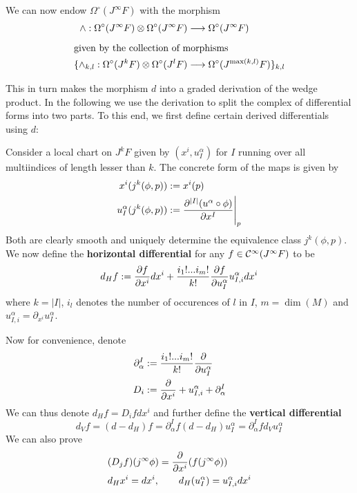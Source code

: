 We can now endow $\Omega^\circ(J^\infty F)$ with the morphism
\begin{align*}
  \wedge: \Omega^\circ(J^\infty F) \mathbin{\mathop{\otimes}\displaylimits_{}} \Omega^\circ(J^\infty F) &\longrightarrow \Omega^\circ(J^\infty F)\\
  \intertext{given by the collection of morphisms}
  \{ \wedge_{k,l}: \Omega^\circ(J^k F) \mathbin{\mathop{\otimes}\displaylimits_{}} \Omega^\circ(J^l F) &\longrightarrow \Omega^\circ(J^{\max(k,l)} F) \}_{k,l}
\end{align*}
This in turn makes the morphism $d$ into a graded derivation of the wedge product. In the following we use the derivation to split the complex of differential forms into two parts. To this end, we first define certain derived differentials using $d$:

\begin{definition}
  Consider a local chart on $J^kF$ given by $(x^i, u^\alpha_I)$ for $I$ running over all multiindices of length lesser than $k$. The concrete form of the maps is given by
  \begin{align*}
    x^i(j^k(\phi, p)) &:= x^i(p)\\
    u^\alpha_I (j^k(\phi, p)) &:= \dell{^{|I|} (u^\alpha \circ \phi)}{x^I} \Bigg|_p
  \end{align*}
  Both are clearly smooth and uniquely determine the equivalence class $j^k(\phi, p)$. We now define the \textbf{horizontal differential} for any $f\in\mathcal{C}^{\infty}(J^\infty F)$ to be
  $$ d_H f := \frac{\partial f}{\partial x^i} dx^i + \frac{i_1 ! ... i_m !}{k!} \frac{\partial f}{\partial u^\alpha_I} u^\alpha_{I,i} dx^i$$
  where $k = |I|$, $i_l$ denotes the number of occurences of $l$ in $I$, $m = \dim(M)$ and $u^\alpha_{I,i} = \partial_{x^i} u^\alpha_I$.
\end{definition}

Now for convenience, denote
\begin{align*}
  \partial^I_\alpha &:= \frac{i_1 ! ... i_m !}{k!} \frac{\partial }{\partial u^\alpha_I}\\
  D_i &:= \frac{\partial }{\partial x^i} + u^\alpha_{I,i} + \partial^I_\alpha
\end{align*}
We can thus denote $d_H f = D_i f dx^i$ and further define the \textbf{vertical differential}
$$ d_V f = (d-d_H) f = \partial^I_\alpha f (d-d_H) u^\alpha_I = \partial^I_\alpha f d_V u^\alpha_I$$
We can also prove
\begin{align*}
  &(D_j f ) (j^\infty \phi) = \dell{}{x^i}(f(j^\infty \phi))\\
  &d_H x^i = dx^i, \quad \quad d_H(u^\alpha_I) = u^\alpha_{I,i} dx^i
\end{align*}

